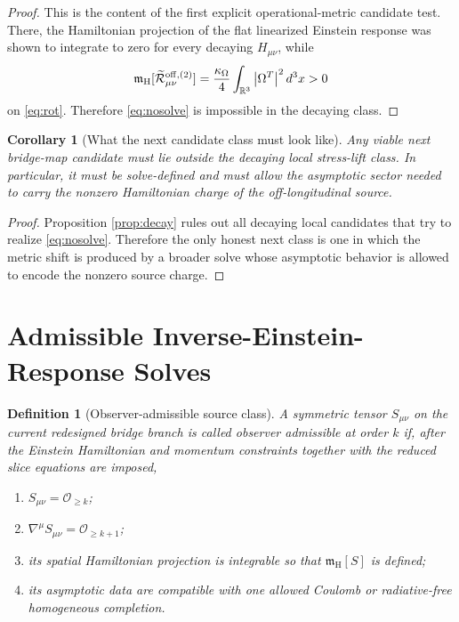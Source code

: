 \documentclass[11pt]{article}
\newcommand{\ReOffTwo}{\widetilde{\mathcal R}_{\mu\nu}^{\mathrm{off},(2)}}
\newcommand{\HamCharge}{\mathfrak m_{\mathrm H}}
\newtheorem{definition}{Definition}
\newtheorem{corollary}{Corollary}
\begin{document}
\begin{proof}
This is the content of the first explicit operational-metric candidate test. There, the Hamiltonian projection of the flat linearized Einstein response was shown to integrate to zero for every decaying \(H_{\mu\nu}\), while
\[
\HamCharge[\ReOffTwo]
=
\frac{\kappa_\Omega}{4}\int_{\mathbb R^3}\abs{\Omega^T}^2\,d^3x
>0
\]
on \eqref{eq:rot}. Therefore \eqref{eq:nosolve} is impossible in the decaying class.
\end{proof}

\begin{corollary}[What the next candidate class must look like]
\label{cor:must}
Any viable next bridge-map candidate must lie outside the decaying local stress-lift class. In particular, it must be solve-defined and must allow the asymptotic sector needed to carry the nonzero Hamiltonian charge of the off-longitudinal source.
\end{corollary}

\begin{proof}
Proposition \ref{prop:decay} rules out all decaying local candidates that try to realize \eqref{eq:nosolve}. Therefore the only honest next class is one in which the metric shift is produced by a broader solve whose asymptotic behavior is allowed to encode the nonzero source charge.
\end{proof}

\section{Admissible Inverse-Einstein-Response Solves}

\begin{definition}[Observer-admissible source class]
\label{def:adm}
A symmetric tensor \(S_{\mu\nu}\) on the current redesigned bridge branch is called \emph{observer admissible at order \(k\)} if, after the Einstein Hamiltonian and momentum constraints together with the reduced slice equations are imposed,
\begin{enumerate}
    \item \(S_{\mu\nu}=\mathcal O_{\ge k}\);
    \item \(\nabla^\mu S_{\mu\nu}=\mathcal O_{\ge k+1}\);
    \item its spatial Hamiltonian projection is integrable so that \(\HamCharge[S]\) is defined;
    \item its asymptotic data are compatible with one allowed Coulomb or radiative-free homogeneous completion.
\end{enumerate}
\end{definition}
\end{document}
